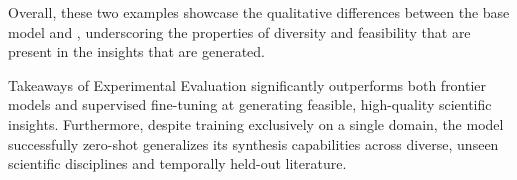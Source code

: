 Overall, these two examples showcase the qualitative differences between the base model and \ourmethod{}, underscoring the properties of diversity and feasibility that are present in the insights that are generated.

\begin{AIbox}{Takeaways of Experimental Evaluation}
\ourmethod{} significantly outperforms both frontier models and supervised fine-tuning at generating feasible, high-quality scientific insights. Furthermore, despite training exclusively on a single domain, the model successfully zero-shot generalizes its synthesis capabilities across diverse, unseen scientific disciplines and temporally held-out literature.
\end{AIbox}




